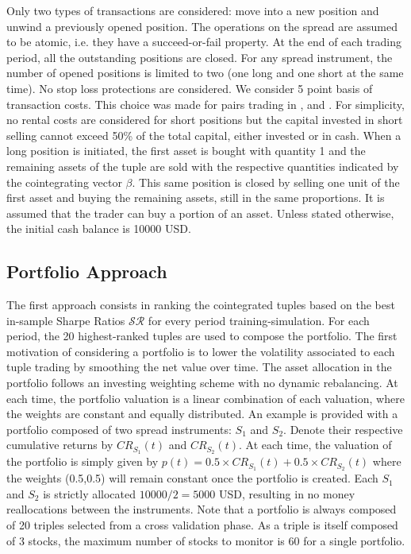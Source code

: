 \documentclass[11pt,a4,twosided,singlespacing,titlepagenumber=on]{scrreprt}
\numberwithin{equation}{chapter} %
\theoremstyle{remark}
\begin{document}
Only two types of transactions are considered: move into a new position and unwind a previously opened position. The operations on the spread are assumed to be atomic, i.e. they have a succeed-or-fail property. At the end of each trading period, all the outstanding positions are closed. For any spread instrument, the number of opened positions is limited to two (one long and one short at the same time). No stop loss protections are considered. We consider 5 point basis of transaction costs. This choice was made for pairs trading in \cite{dunis2010}, \cite{dunis2005} and \cite{alexander2002}. For simplicity, no rental costs are considered for short positions but the capital invested in short selling cannot exceed 50\% of the total capital, either invested or in cash. When a long position is initiated, the first asset is bought with quantity 1 and the remaining assets of the tuple are sold with the respective quantities indicated by the cointegrating vector $\beta$. This same position is closed by selling one unit of the first asset and buying the remaining assets, still in the same proportions. It is assumed that the trader can buy a portion of an asset. Unless stated otherwise, the initial cash balance is 10000 USD.

\subsection{Portfolio Approach}

The first approach consists in ranking the cointegrated tuples based on the best in-sample Sharpe Ratios $\mathcal{SR}$ for every period training-simulation. For each period, the 20 highest-ranked tuples are used to compose the portfolio. The first motivation of considering a portfolio is to lower the volatility associated to each tuple trading by smoothing the net value over time. The asset allocation in the portfolio follows an investing weighting scheme with no dynamic rebalancing. At each time, the portfolio valuation is a linear combination of each valuation, where the weights are constant and equally distributed. An example is provided with a portfolio composed of two spread instruments: $S_1$ and $S_2$. Denote their respective cumulative returns by $CR_{S_1}(t)$ and $CR_{S_2}(t)$. At each time, the valuation of the portfolio is simply given by $p(t) = 0.5 \times CR_{S_1}(t) + 0.5 \times CR_{S_2}(t)$ where the weights (0.5,0.5) will remain constant once the portfolio is created. Each $S_1$ and $S_2$ is strictly allocated $10000/2 = 5000$ USD, resulting in no money reallocations between the instruments. Note that a portfolio is always composed of 20 triples selected from a cross validation phase. As a triple is itself composed of 3 stocks, the maximum number of stocks to monitor is 60 for a single portfolio. 
\end{document}
